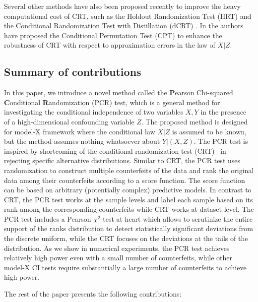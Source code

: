 \documentclass[11pt]{article}
\begin{document}
Several other methods have also been proposed recently to improve the heavy computational cost of  CRT, such as the Holdout Randomization Test (HRT) \cite{tansey2018holdout} and the Conditional Randomization Test with Distillation (dCRT) \cite{liu2020fast}.  In \cite{berrett2020conditional} the authors   have proposed the Conditional Permutation Test (CPT)  to enhance the robustness of CRT with respect to approximation errors in the law of $X|Z$.

\subsection{Summary of contributions}
In this paper, we introduce a novel method called the {\bf P}earson Chi-squared {\bf C}onditional {\bf R}andomization (PCR) test, which is a general method for investigating the conditional independence of two variables $X,Y$ in the presence of a high-dimensional confounding variable $Z$.  The proposed method is designed for model-X framework where the conditional law $X|Z$ is assumed to be known, but the method assumes nothing whatsoever about  $Y|(X,Z)$. The PCR test is inspired by shortcoming of the conditional randomization test (CRT)~\cite{candes2018panning} in rejecting specific alternative distributions. Similar to CRT, the PCR test uses randomization to construct multiple counterfeits of the data and rank the original data among their counterfeits according to a score function. The score function can be based on arbitrary (potentially complex) predictive models. In contrast to CRT, the PCR test works at the sample levels and label each sample based on its rank among the corresponding counterfeits while CRT works at dataset level. The PCR test includes a Pearson $\chi^2$-test at heart which allows to scrutinize the entire support of the ranks distribution to detect statistically significant deviations from the discrete uniform, while the CRT focuses on the deviations at the tails of the distribution.
As we show in numerical experiments, the PCR test achieves relatively high power even with a small number of counterfeits, while other model-X CI tests require substantially a large number of counterfeits to achieve high power. 

The rest of the paper presents the following contributions:
\end{document}
